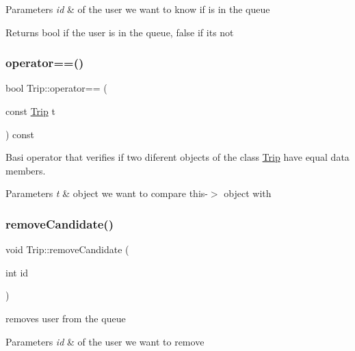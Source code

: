 \begin{DoxyParams}{Parameters}
{\em id} & of the user we want to know if is in the queue \\
\hline
\end{DoxyParams}
\begin{DoxyReturn}{Returns}
bool if the user is in the queue, false if it\textquotesingle{}s not 
\end{DoxyReturn}
\mbox{\label{group___trip_ga1462791c70b237e595244b16e086850f}} 
\subsubsection{\texorpdfstring{operator==()}{operator==()}}
{\footnotesize\ttfamily bool Trip\+::operator== (\begin{DoxyParamCaption}\item[{const \hyperlink{class_trip}{Trip}}]{t }\end{DoxyParamCaption}) const}



Basi operator that verifies if two diferent objects of the class \hyperlink{class_trip}{Trip} have equal data members. 


\begin{DoxyParams}{Parameters}
{\em t} & object we want to compare this-\/$>$ object with \\
\hline
\end{DoxyParams}
\mbox{\label{group___trip_ga5c0fbf9c2320dc4799896295788eff9e}} 
\subsubsection{\texorpdfstring{remove\+Candidate()}{removeCandidate()}}
{\footnotesize\ttfamily void Trip\+::remove\+Candidate (\begin{DoxyParamCaption}\item[{int}]{id }\end{DoxyParamCaption})}



removes user from the queue 


\begin{DoxyParams}{Parameters}
{\em id} & of the user we want to remove \\
\hline
\end{DoxyParams}
\mbox{\label{group___trip_ga6ae6134652b644fa63bf267b956f1e75}} 
